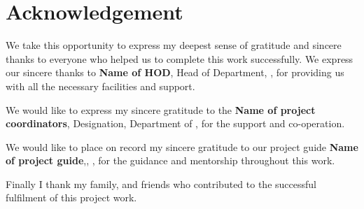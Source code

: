 \chapter*{Acknowledgement}%
%



\par We take this opportunity to express my deepest sense of gratitude and sincere thanks to everyone who helped us to complete this work successfully. We express our sincere thanks to \textbf{Name of HOD}, Head of Department, \dept, \college\hspace*{2pt} for providing  us with all the necessary facilities and support.\par

We would like to express my sincere gratitude to the \textbf{Name of project coordinators}, Designation, \hspace*{2pt} Department of \hspace*{2pt} \dept, \hspace*{2pt} \college \hspace*{2pt} \hspace*{2pt} for the support and co-operation.

We would like to place on record my sincere gratitude to our project guide \textbf{Name of project guide},\hspace*{2pt}\guidedes, \hspace*{2pt}\dept, \hspace*{2pt}\college \hspace*{2pt} %
for the guidance and mentorship throughout this work.

Finally I thank my family, and friends who contributed to the successful fulfilment of this project work.

\vspace*{30pt}
\begin{flushright}
	\textbf{\studentA}\\
	\textbf{\studentB}\\
	\textbf{\studentC}\\
	\textbf{\studentD}\\
\end{flushright}
\thispagestyle{plain}
